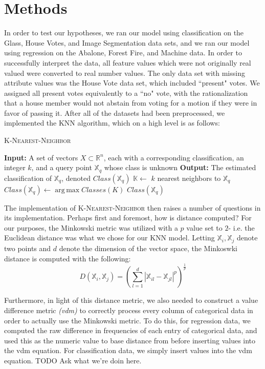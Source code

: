 \documentclass[twoside,11pt]{article}
\DeclareMathOperator*{\argmax}{arg\,max}
\begin{document}
\section{Methods}
In order to test our hypotheses, we ran our model using classification on the Glass, House Votes, and Image Segmentation data sets, and 
we ran our model using regression on the Abalone, Forest Fire, and Machine data. In order to successfully interpret the data, all feature values
which were not originally real valued were converted to real number values. The only data set with missing attribute values was the House Vote
data set, which included ``present" votes. We assigned all present votes equivalently to a ``no" vote, with the rationalization that a house member
would not abstain from voting for a motion if they were in favor of passing it. After all of the datasets had been preprocessed, we implemented the
KNN algorithm, which on a high level is as follows:
\begin{algorithm}
\begin{algorithmic}
\caption{\textsc{K-Nearest-Neighbor}}
\STATE \textbf{Input:} A set of vectors $X \subset \mathbb{R}^n$, each with a corresponding classification, an integer $k$, and a query point $\mathbb{X}_q$ whose class is unknown
\STATE \textbf{Output:} The estimated classification of $\mathbb{X}_q$, denoted $Class(\mathbb{X}_q)$
\STATE $\mathbb{K} \gets$ $k$ nearest neighbors to $\mathbb{X}_q$
\STATE $Class(\mathbb{X}_q) \gets \argmax{Classes(K)}$ 
\STATE \RETURN $Class(\mathbb{X}_q)$
\end{algorithmic}
\end{algorithm}

The implementation of \textsc{K-Nearest-Neighbor} then raises a number of questions in its implementation. Perhaps first and foremost, how is
distance computed? For our purposes, the Minkowski metric was utilized with a $p$ value set to $2$- i.e. the Euclidean distance was
what we chose for our KNN model. Letting $\mathbb{X}_i, \mathbb{X}_j$ denote two points and $d$ denote the dimension of the vector space,
the Minkoswki distance is computed with the following:
\begin{equation}
D(\mathbb{X}_i, \mathbb{X}_j) = (\sum_{l = 1}^{d} |\mathbb{X}_{il} - \mathbb{X}_{jl}|^p)^\frac{1}{p}
\end{equation}

Furthermore, in light of this distance metric, we also needed to construct a value difference metric \textit{(vdm)} to correctly process every column of
categorical data in order to actually use the Minkowski metric. To do this, for regression data, we computed the raw difference in frequencies
of each entry of categorical data, and used this as the numeric value to base distance from before inserting values into the vdm equation.
 For classification data, we simply insert values into the vdm equation. 
 TODO Ask what we're doin here.
 
\end{document}
